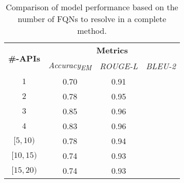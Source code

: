 \begin{table}[]
\centering
\begin{tabular}{l|ccc}
\toprule
\multirow{2}{*}{\textbf{\#-APIs}} & \multicolumn{3}{c}{\textbf{Metrics}}                                  \\ \cline{2-4} 
                                   & \multicolumn{1}{c|}{\textit{Accuracy\textsubscript{EM}}} & \multicolumn{1}{c|}{\textit{ROUGE-L}} & \textit{BLEU-2} \\ \hline
\multicolumn{1}{c|}{$1$}      & \multicolumn{1}{c|}{0.70}         & \multicolumn{1}{c|}{0.91}        &   \\
\multicolumn{1}{c|}{$2$}      & \multicolumn{1}{c|}{0.78}         & \multicolumn{1}{c|}{0.95}        &   \\ 
\multicolumn{1}{c|}{$3$}      & \multicolumn{1}{c|}{0.85}         & \multicolumn{1}{c|}{0.96}        &   \\ 
\multicolumn{1}{c|}{$4$}      & \multicolumn{1}{c|}{0.83}         & \multicolumn{1}{c|}{0.96}        &   \\ 
\multicolumn{1}{c|}{$[5, 10)$}      & \multicolumn{1}{c|}{0.78}         & \multicolumn{1}{c|}{0.94}        &   \\ 
\multicolumn{1}{c|}{$[10, 15)$}      & \multicolumn{1}{c|}{0.74}         & \multicolumn{1}{c|}{0.93}        &   \\ 
\multicolumn{1}{c|}{$[15, 20)$}      & \multicolumn{1}{c|}{0.74}         & \multicolumn{1}{c|}{0.93}        &   \\ \bottomrule
\end{tabular}
\caption{Comparison of model performance based on the number of FQNs to resolve in a complete method.}
\label{tab:ablation}
\end{table}